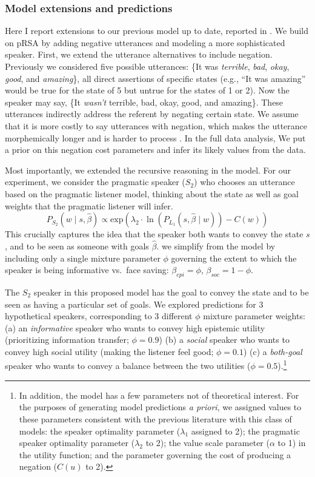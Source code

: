 \subsubsection{Model extensions and predictions} 

Here I report extensions to our previous model up to date, reported in \citet{yoon2017}. 
We build on pRSA by adding negative utterances and modeling a more
sophisticated speaker. First, we extend the utterance alternatives to
include negation. Previously we considered five possible utterances:
\{It was \emph{terrible}, \emph{bad}, \emph{okay}, \emph{good}, and
\emph{amazing}\}, all direct assertions of specific states (e.g., ``It
was amazing'' would be true for the state of 5 but untrue for the states
of 1 or 2). Now the speaker may say, \{It \emph{wasn't} terrible, bad,
okay, good, and amazing\}. These utterances indirectly address the
referent by negating certain state. We assume that it is more costly to
say utterances with negation, which makes the utterance morphemically
longer and is harder to process \citep{clark1972}. In the full data
analysis, We put a prior on this negation cost parameters and infer its
likely values from the data.

Most importantly, we extended the recursive reasoning in the model. For
our experiment, we consider the pragmatic speaker (\(S_2\)) who chooses
an utterance based on the pragmatic listener model, 
thinking about the state as well as goal weights that the pragmatic
listener will infer.
\[P_{S_2}(w \mid s, \hat{\beta})\propto \mathrm{exp}(\lambda_{2} \cdot \ln(P_{L_1}(s,  \hat{\beta} \mid w)) - C(w))\]
This crucially captures the idea that the speaker both wants to convey
the state \(s\), and to be seen as someone with goals \(\hat{\beta}\).
we simplify from the \citet{yoon2016} model by including only a single
mixture parameter \(\phi\) governing the extent to which the speaker is
being informative vs.~face saving: \(\beta_{epi} = \phi\),
\(\beta_{soc} = 1 - \phi\).

The \(S_2\) speaker in this proposed model has the goal to convey the state and to
be seen as having a particular set of goals. We explored predictions for
3 hypothetical speakers, corresponding to 3 different \(\phi\) mixture
parameter weights: (a) an \emph{informative} speaker who wants to convey
high epistemic utility (prioritizing information transfer;
\(\phi = 0.9\)) (b) a \emph{social} speaker who wants to convey high
social utility (making the listener feel good; \(\phi = 0.1\)) (c) a
\emph{both-goal} speaker who wants to convey a balance between the two
utilities (\(\phi = 0.5\)).\footnote{In addition, the model has a few
  parameters not of theoretical interest. For the purposes of generating
  model predictions \emph{a priori}, we assigned values to these
  parameters consistent with the previous literature with this class of
  models: the speaker optimality parameter (\(\lambda_{1}\) assigned to
  2); the pragmatic speaker optimality parameter (\(\lambda_{2}\) to 2);
  the value scale parameter (\(\alpha\) to 1) in the utility function;
  and the parameter governing the cost of producing a negation (\(C(u)\)
  to 2).}

